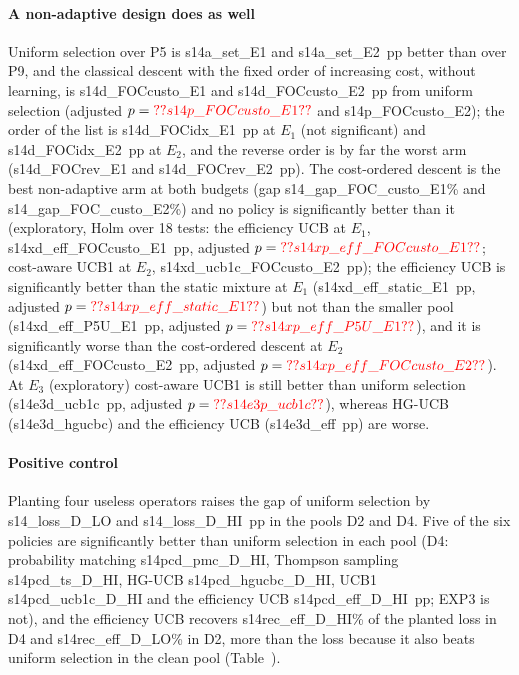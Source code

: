 \paragraph{A non-adaptive design does as well} Uniform selection over P5 is \num{s14a_set_E1} and \num{s14a_set_E2}~pp better than over P9, and the classical descent with the fixed order of increasing cost, without learning, is \num{s14d_FOCcusto_E1} and \num{s14d_FOCcusto_E2}~pp from uniform selection (adjusted $p=\num{s14p_FOCcusto_E1}$ and \num{s14p_FOCcusto_E2}); the order of the list is \num{s14d_FOCidx_E1}~pp at $E_1$ (not significant) and \num{s14d_FOCidx_E2}~pp at $E_2$, and the reverse order is by far the worst arm (\num{s14d_FOCrev_E1} and \num{s14d_FOCrev_E2}~pp). The cost-ordered descent is the best non-adaptive arm at both budgets (gap \num{s14_gap_FOC_custo_E1}\% and \num{s14_gap_FOC_custo_E2}\%) and no policy is significantly better than it (exploratory, Holm over 18 tests: the efficiency UCB at $E_1$, \num{s14xd_eff_FOCcusto_E1}~pp, adjusted $p=\num{s14xp_eff_FOCcusto_E1}$; cost-aware UCB1 at $E_2$, \num{s14xd_ucb1c_FOCcusto_E2}~pp); the efficiency UCB is significantly better than the static mixture at $E_1$ (\num{s14xd_eff_static_E1}~pp, adjusted $p=\num{s14xp_eff_static_E1}$) but not than the smaller pool (\num{s14xd_eff_P5U_E1}~pp, adjusted $p=\num{s14xp_eff_P5U_E1}$), and it is significantly worse than the cost-ordered descent at $E_2$ (\num{s14xd_eff_FOCcusto_E2}~pp, adjusted $p=\num{s14xp_eff_FOCcusto_E2}$). At $E_3$ (exploratory) cost-aware UCB1 is still better than uniform selection (\num{s14e3d_ucb1c}~pp, adjusted $p=\num{s14e3p_ucb1c}$), whereas HG-UCB (\num{s14e3d_hgucbc}) and the efficiency UCB (\num{s14e3d_eff}~pp) are worse.

\paragraph{Positive control} Planting four useless operators raises the gap of uniform selection by \num{s14_loss_D_LO} and \num{s14_loss_D_HI}~pp in the pools D2 and D4. Five of the six policies are significantly better than uniform selection in each pool (D4: probability matching \num{s14pcd_pmc_D_HI}, Thompson sampling \num{s14pcd_ts_D_HI}, HG-UCB \num{s14pcd_hgucbc_D_HI}, UCB1 \num{s14pcd_ucb1c_D_HI} and the efficiency UCB \num{s14pcd_eff_D_HI}~pp; EXP3 is not), and the efficiency UCB recovers \num{s14rec_eff_D_HI}\% of the planted loss in D4 and \num{s14rec_eff_D_LO}\% in D2, more than the loss because it also beats uniform selection in the clean pool (Table~).

